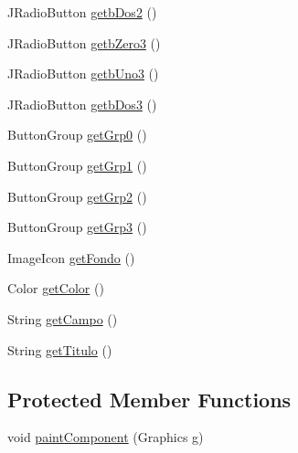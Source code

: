 \begin{DoxyCompactItemize}
J\+Radio\+Button \mbox{\hyperlink{classdiagnostico_1_1_plantilla_juegos8__juego__abstraccion_ae91c2c6b13644a76e12ac6c73a920d07}{getb\+Dos2}} ()
\item 
J\+Radio\+Button \mbox{\hyperlink{classdiagnostico_1_1_plantilla_juegos8__juego__abstraccion_a600abdfb34bd3cf0935b48ca94857277}{getb\+Zero3}} ()
\item 
J\+Radio\+Button \mbox{\hyperlink{classdiagnostico_1_1_plantilla_juegos8__juego__abstraccion_ab3f2044ce35362957a518f3c0e4b9e4e}{getb\+Uno3}} ()
\item 
J\+Radio\+Button \mbox{\hyperlink{classdiagnostico_1_1_plantilla_juegos8__juego__abstraccion_a675a4cf65ce01e7858231344377b1858}{getb\+Dos3}} ()
\item 
Button\+Group \mbox{\hyperlink{classdiagnostico_1_1_plantilla_juegos8__juego__abstraccion_a36963b968ae62b6961bd6eb54f25d848}{get\+Grp0}} ()
\item 
Button\+Group \mbox{\hyperlink{classdiagnostico_1_1_plantilla_juegos8__juego__abstraccion_a8535f44b366b67bf01f41d82abbe086e}{get\+Grp1}} ()
\item 
Button\+Group \mbox{\hyperlink{classdiagnostico_1_1_plantilla_juegos8__juego__abstraccion_a27f90909bbeeb6cc0661a381678cf174}{get\+Grp2}} ()
\item 
Button\+Group \mbox{\hyperlink{classdiagnostico_1_1_plantilla_juegos8__juego__abstraccion_a490f84e01938c806f5ab08ca5d29d695}{get\+Grp3}} ()
\item 
Image\+Icon \mbox{\hyperlink{classdiagnostico_1_1_plantilla_juegos8__juego__abstraccion_af063ab25b4eb0aaf4d92baa7ca50733c}{get\+Fondo}} ()
\item 
Color \mbox{\hyperlink{classdiagnostico_1_1_plantilla_juegos8__juego__abstraccion_aac1c5760ca3015e1f534b9912fc1fa44}{get\+Color}} ()
\item 
String \mbox{\hyperlink{classdiagnostico_1_1_plantilla_juegos8__juego__abstraccion_a5829dd63e4de661373fb3c301e4a9d17}{get\+Campo}} ()
\item 
String \mbox{\hyperlink{classdiagnostico_1_1_plantilla_juegos8__juego__abstraccion_aee8cc000910293ad5a6be8563bce345d}{get\+Titulo}} ()
\end{DoxyCompactItemize}
\subsection*{Protected Member Functions}
\begin{DoxyCompactItemize}
\item 
void \mbox{\hyperlink{classdiagnostico_1_1_plantilla_juegos8__juego__abstraccion_a2801675f72c97dc97f77c4934a924336}{paint\+Component}} (Graphics g)
\end{DoxyCompactItemize}


